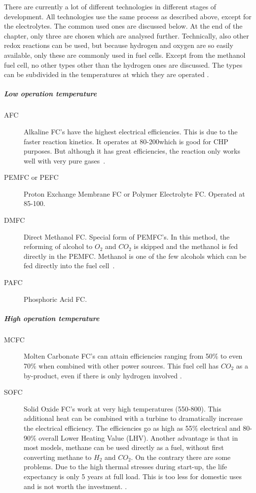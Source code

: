 There are currently a lot of different technologies in different stages of development. All technologies use the same process as described above, except for the electrolytes. The common used ones are discussed below. At the end of the chapter, only three are chosen which are analysed further. Technically, also other redox reactions can be used, but because hydrogen and oxygen are so easily available, only these are commonly used in fuel cells. Except from the methanol fuel cell, no other types other than the hydrogen ones are discussed. The types can be subdivided in the temperatures at which they are operated \cite{Carrette2000}.
\subparagraph{Low operation temperature}
\begin{description}
  \item[AFC] Alkaline FC's have the highest electrical efficiencies. This is due to the faster reaction kinetics. It operates at 80-200\degreeC which is good for CHP purposes. But although it has great efficiencies, the reaction only works well with very pure gases~\cite{Carrette2000}.
  \item[PEMFC or PEFC] Proton Exchange Membrane FC or Polymer Electrolyte FC. Operated at 85-100\degreeC .
  \item[DMFC] Direct Methanol FC. Special form of PEMFC's. In this method, the reforming of alcohol to $O_2$ and $CO_2$ is skipped and the methanol is fed directly in the PEMFC. Methanol is one of the few alcohols which can be fed directly into the fuel cell~\cite{Carrette2000}.
  \item[PAFC] Phosphoric Acid FC.
\end{description}
\subparagraph{High operation temperature}
\begin{description}
  \item[MCFC] Molten Carbonate FC's can attain efficiencies ranging from 50\% to even 70\% when combined with other power sources. This fuel cell has $CO_2$ as a by-product, even if there is only hydrogen involved \cite{Carrette2000}.
  \item[SOFC] Solid Oxide FC's work at very high temperatures (550-800\degreeC ). This additional heat can be combined with a turbine to dramatically increase the electrical efficiency. The efficiencies go as high as 55\% electrical and 80-90\% overall Lower Heating Value (LHV). Another advantage is that in most models, methane can be used directly as a fuel, without first converting methane to $H_2$ and $CO_2$. On the contrary there are some problems. Due to the high thermal stresses during start-up, the life expectancy is only 5 years at full load. This is too less for domestic uses and is not worth the investment. \cite{Carrette2000,Hawkes2005}.
\end{description}
